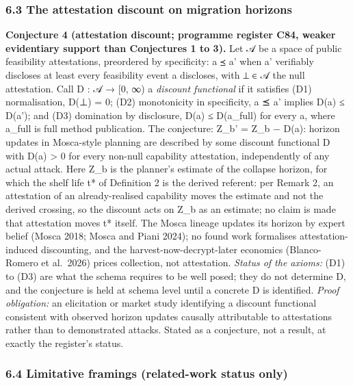 \documentclass[
]{llncs}
\begin{document}
\subsubsection{6.3 The attestation discount on migration
horizons}\label{the-attestation-discount-on-migration-horizons}

\textbf{Conjecture 4 (attestation discount; programme register C84,
weaker evidentiary support than Conjectures 1 to 3).} Let 𝒜 be a space
of public feasibility attestations, preordered by specificity: a ⪯ a'
when a' verifiably discloses at least every feasibility event a
discloses, with ⊥ ∈ 𝒜 the null attestation. Call D : 𝒜 → {[}0, ∞) a
\emph{discount functional} if it satisfies (D1) normalisation, D(⊥) = 0;
(D2) monotonicity in specificity, a ⪯ a' implies D(a) ≤ D(a'); and (D3)
domination by disclosure, D(a) ≤ D(a\_full) for every a, where a\_full
is full method publication. The conjecture: Z\_b' = Z\_b − D(a): horizon
updates in Mosca-style planning are described by some discount
functional D with D(a) \textgreater{} 0 for every non-null capability
attestation, independently of any actual attack. Here Z\_b is the
planner's estimate of the collapse horizon, for which the shelf life t*
of Definition 2 is the derived referent: per Remark 2, an attestation of
an already-realised capability moves the estimate and not the derived
crossing, so the discount acts on Z\_b as an estimate; no claim is made
that attestation moves t* itself. The Mosca lineage updates its horizon
by expert belief (Mosca 2018; Mosca and Piani 2024); no found work
formalises attestation-induced discounting, and the
harvest-now-decrypt-later economics (Blanco-Romero et al.~2026) prices
collection, not attestation. \emph{Status of the axioms:} (D1) to (D3)
are what the schema requires to be well posed; they do not determine D,
and the conjecture is held at schema level until a concrete D is
identified. \emph{Proof obligation:} an elicitation or market study
identifying a discount functional consistent with observed horizon
updates causally attributable to attestations rather than to
demonstrated attacks. Stated as a conjecture, not a result, at exactly
the register's status.

\subsubsection{6.4 Limitative framings (related-work status
only)}\label{limitative-framings-related-work-status-only}
\end{document}
